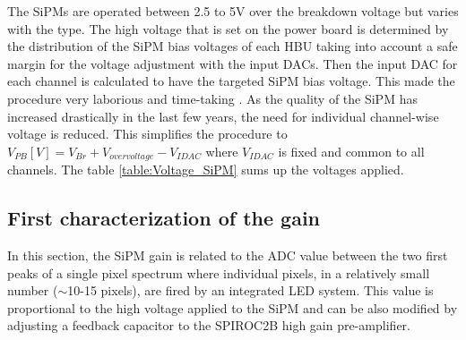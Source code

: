 The SiPMs are operated between 2.5 to 5V over the breakdown voltage but varies with the type. The high voltage that is set on the power board is determined by the distribution of the SiPM bias voltages of each HBU taking into account a safe margin for the voltage adjustment with the input DACs. Then the input DAC for each channel is calculated to have the targeted SiPM bias voltage. This made the procedure very laborious and time-taking \cite{Hartbrich2012}. As the quality of the SiPM has increased drastically in the last few years, the need for individual channel-wise voltage is reduced. This simplifies the procedure to $V_{PB} [V] = V_{Br} + V_{overvoltage} - V_{IDAC}$ where $V_{IDAC}$ is fixed and common to all channels. The table \ref{table:Voltage_SiPM} sums up the voltages applied.

\begin{table}[htb!]
  \centering
  \caption{List of breakdown and operating voltages applied to each SiPM types. $V_{op}$ represents $V_{Br} + V_{overvoltage}$.}
  \label{table:Voltage_SiPM}
\end{table}

\subsection{First characterization of the gain}

In this section, the SiPM gain is related to the ADC value between the two first peaks of a single pixel spectrum where individual pixels, in a relatively small number ($\sim$10-15 pixels), are fired by an integrated LED system. This value is proportional to the high voltage applied to the SiPM and can be also modified by adjusting a feedback capacitor to the SPIROC2B high gain pre-amplifier.

